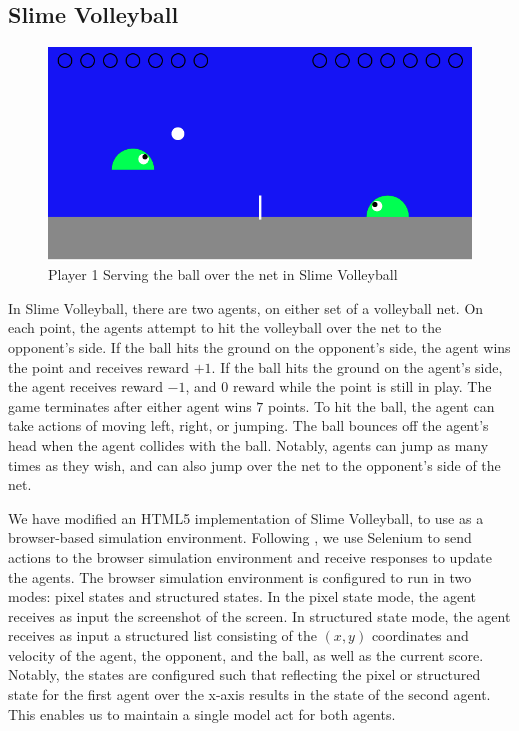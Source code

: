 \documentclass[10pt,twocolumn,letterpaper]{article}
\begin{document}
\subsection{Slime Volleyball}


\begin{figure}[h]
\center
\includegraphics[width=\columnwidth]{SlimeVolleyBall}
\caption{
Player 1 Serving the ball over the net in Slime Volleyball
}\label{fig:slime}
\end{figure}


In Slime Volleyball, there are two agents, on either set of a volleyball net.
On each point, the agents attempt to hit the volleyball over the net to the
opponent's side. If the ball hits the ground on the opponent's side, the agent
wins the point and receives reward $+1$. If the ball hits the ground on the
agent's side, the agent receives reward $-1$, and $0$ reward while the point
is still in play. The game terminates after either agent wins $7$ points. To
hit the ball, the agent can take actions of moving left, right, or jumping.
The ball bounces off the agent's head when the agent collides with the ball.
Notably, agents can jump as many times as they wish, and can also jump over
the net to the opponent's side of the net.

We have modified an HTML5 implementation of Slime Volleyball, to use
as a browser-based simulation environment. Following \citep{shi2017world}, we use
Selenium to send actions to the browser simulation environment and receive
responses to update the agents. The browser simulation environment is
configured to run in two modes: pixel states and structured states. In the
pixel state mode, the agent receives as input the screenshot of the screen. In
structured state mode, the agent receives as input a structured list
consisting of the $(x, y)$ coordinates and velocity of the agent, the
opponent, and the ball, as well as the current score. Notably, the states are
configured such that reflecting the pixel or structured state for the first
agent over the x-axis results in the state of the second agent. This enables
us to maintain a single model act for both agents.
\end{document}
